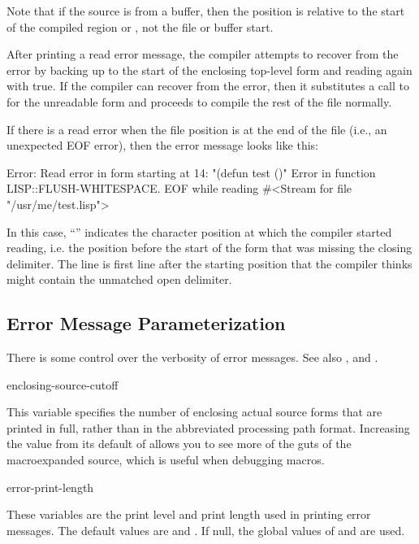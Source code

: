 Note that if the source is from a \hemlock{} buffer, then the position
is relative to the start of the compiled region or , not the
file or buffer start.

After printing a read error message, the compiler attempts to recover from the
error by backing up to the start of the enclosing top-level form and reading
again with  true.  If the compiler can recover from the
error, then it substitutes a call to  for the unreadable form and
proceeds to compile the rest of the file normally.

If there is a read error when the file position is at the end of the file
(i.e., an unexpected EOF error), then the error message looks like this:

\begin{example}
Error: Read error in form starting at 14:
 "(defun test ()"
Error in function LISP::FLUSH-WHITESPACE.
EOF while reading #<Stream for file "/usr/me/test.lisp">
\end{example}

In this case, ``'' indicates the character
position at which the compiler started reading, i.e. the position
before the start of the form that was missing the closing delimiter.
The line  is first line after the starting
position that the compiler thinks might contain the unmatched open
delimiter.


\subsection{Error Message Parameterization}

There is some control over the verbosity of error messages.  See also
,  and
.

\begin{defvar}{}{enclosing-source-cutoff} 
  
  This variable specifies the number of enclosing actual source forms
  that are printed in full, rather than in the abbreviated processing
  path format.  Increasing the value from its default of 
  allows you to see more of the guts of the macroexpanded source,
  which is useful when debugging macros.
\end{defvar}

\begin{defvar}{}{error-print-length}
  
  These variables are the print level and print length used in
  printing error messages.  The default values are  and
  .  If null, the global values of  and
   are used.
\end{defvar}

